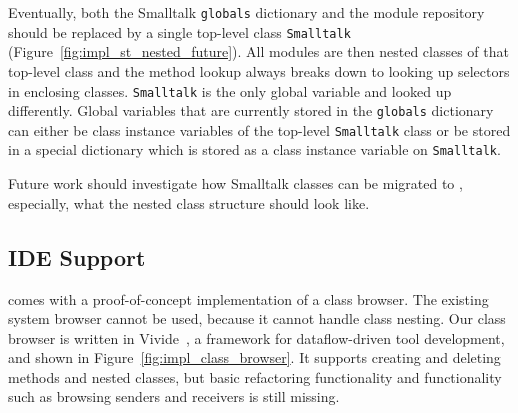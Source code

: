 Eventually, both the Smalltalk \texttt{globals} dictionary and the module repository should be replaced by a single top-level class \texttt{Smalltalk} (Figure~\ref{fig:impl_st_nested_future}). All modules are then nested classes of that top-level class and the method lookup always breaks down to looking up selectors in enclosing classes. \texttt{Smalltalk} is the only global variable and looked up differently. Global variables that are currently stored in the \texttt{globals} dictionary can either be class instance variables of the top-level \texttt{Smalltalk} class or be stored in a special dictionary which is stored as a class instance variable on \texttt{Smalltalk}.

Future work should investigate how Smalltalk classes can be migrated to \msname, especially, what the nested class structure should look like.


\subsection{IDE Support}
\msname comes with a proof-of-concept implementation of a class browser. The existing system browser cannot be used, because it cannot handle class nesting. Our class browser is written in Vivide~\cite{Taeumel:2012:VPE:2384592.2384604}, a framework for dataflow-driven tool development, and shown in Figure~\ref{fig:impl_class_browser}. It supports creating and deleting methods and nested classes, but basic refactoring functionality and functionality such as browsing senders and receivers is still missing.


